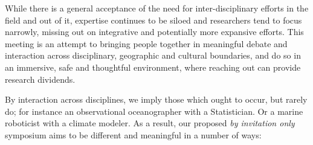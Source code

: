 While there is a general acceptance of the need for inter-disciplinary
efforts in the field and out of it, expertise continues to be siloed
and researchers tend to focus narrowly, missing out on integrative and
potentially more expansive efforts. This meeting is an attempt to
bringing people together in meaningful debate and interaction across
disciplinary, geographic and cultural boundaries, and do so in an
immersive, safe and thoughtful environment, where reaching out can
provide research dividends.

By interaction across disciplines, we imply those which ought to
occur, but rarely do; for instance an observational oceanographer with
a Statistician. Or a marine roboticist with a climate modeler. As a
result, our proposed \emph{by invitation only} symposium aims to be
different and meaningful in a number of ways:

